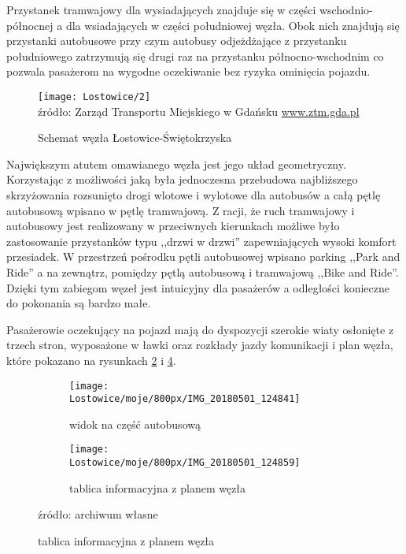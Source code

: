 \documentclass[twoside,12pt]{article}
\begin{document}
	Przystanek tramwajowy dla wysiadających znajduje się w części wschodnio-północnej a dla wsiadających w części południowej węzła. Obok nich znajdują się przystanki autobusowe przy czym autobusy odjeżdżające z przystanku południowego zatrzymują się drugi raz na przystanku północno-wschodnim co pozwala pasażerom na wygodne oczekiwanie bez ryzyka ominięcia pojazdu. 
	
	\begin{figure}[H]
		\centering
		\caption{Schemat węzła Łostowice-Świętokrzyska}
		\texttt{[image: Lostowice/2]}\\
		\footnotesize{źródło: Zarząd Transportu Miejskiego w Gdańsku \url{www.ztm.gda.pl}}
		\label{lostowice3}
	\end{figure}
	
	Największym atutem omawianego węzła jest jego układ geometryczny. Korzystając z możliwości jaką była jednoczesna przebudowa najbliższego skrzyżowania rozsunięto drogi wlotowe i wylotowe dla autobusów a całą pętlę autobusową wpisano w pętlę tramwajową. Z racji, że ruch tramwajowy i autobusowy jest realizowany w przeciwnych kierunkach możliwe było zastosowanie przystanków typu ,,drzwi w drzwi'' zapewniających wysoki komfort przesiadek. W przestrzeń pośrodku pętli autobusowej wpisano parking ,,Park and Ride'' a na zewnątrz, pomiędzy pętlą autobusową i tramwajową ,,Bike and Ride''. Dzięki tym zabiegom węzeł jest intuicyjny dla pasażerów a odległości konieczne do pokonania są bardzo małe. 
	
	Pasażerowie oczekujący na pojazd mają do dyspozycji szerokie wiaty osłonięte z trzech stron, wyposażone w ławki oraz rozkłady jazdy komunikacji i plan węzła, które pokazano na rysunkach \ref{lostowice5a} i \ref{lostowice5b}.
	
	\begin{figure}[H]
	\centering
	\caption{Wyposażenie wiat przystankowych}
	\begin{subfigure}{.48\textwidth}
	  \centering
	  \caption{widok na część autobusową}
	  \texttt{[image: Lostowice/moje/800px/IMG\_20180501\_124841]}
	  \label{lostowice5a}
	\end{subfigure}%
	\hfill%
	\begin{subfigure}{.48\textwidth}
	  \centering
	  \caption{tablica informacyjna z planem węzła}
	  \texttt{[image: Lostowice/moje/800px/IMG\_20180501\_124859]}
	  \label{lostowice5b}
	\end{subfigure}
	
	\footnotesize{źródło: archiwum własne}
	\end{figure}
	
\end{document}
